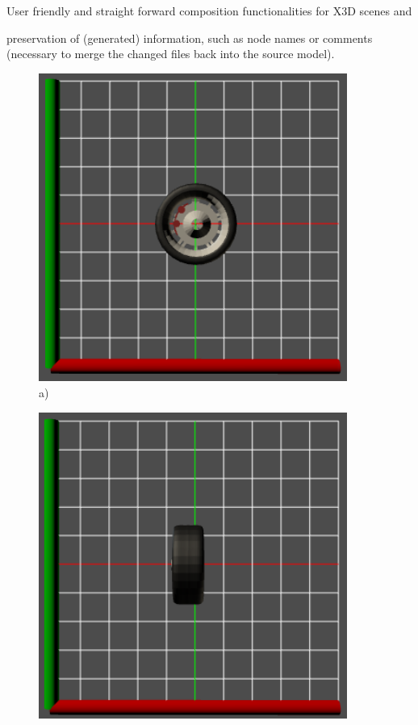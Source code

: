 \begin{itemize*}
  \item User friendly and straight forward composition functionalities for \gls{X3D} scenes and
  \item preservation of (generated) information, such as node names or comments (necessary to merge the changed files back into the source model).
\end{itemize*}

\begin{figure}
  \begin{minipage}{.5\textwidth}
    \centering
    \includegraphics[width=0.9\textwidth]{../assets/wheel1.png}\\
    a)
  \end{minipage}
  \begin{minipage}{.5\textwidth}
    \centering
  	\includegraphics[width=0.9\textwidth]{../assets/wheel2.png}\\

\end{minipage}
\end{figure}
